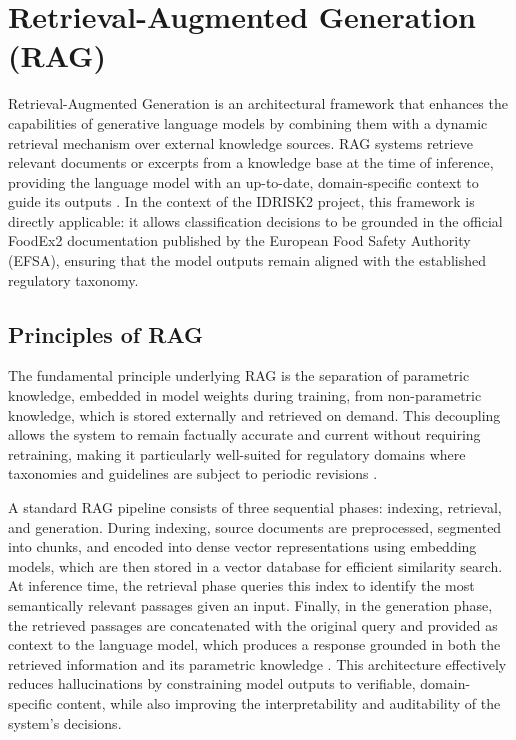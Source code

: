 \hypertarget{retrieval-augmented-generation-rag}{%
\section{Retrieval-Augmented Generation (RAG)}\label{retrieval-augmented-generation-rag}}

Retrieval-Augmented Generation is an architectural framework that enhances the capabilities of generative language models by combining them with a dynamic retrieval mechanism over external knowledge sources. RAG systems retrieve relevant documents or excerpts from a knowledge base at the time of inference, providing the language model with an up-to-date, domain-specific context to guide its outputs \parencite{patrick_lewis_10d460b7,xiaoye_qu_52f808ee}. In the context of the IDRISK2 project, this framework is directly applicable: it allows classification decisions to be grounded in the official FoodEx2 documentation published by the European Food Safety Authority (EFSA), ensuring that the model outputs remain aligned with the established regulatory taxonomy.

\hypertarget{principles-of-rag}{%
\subsection{Principles of RAG}\label{principles-of-rag}}

The fundamental principle underlying RAG is the separation of parametric knowledge, embedded in model weights during training, from non-parametric knowledge, which is stored externally and retrieved on demand. This decoupling allows the system to remain factually accurate and current without requiring retraining, making it particularly well-suited for regulatory domains where taxonomies and guidelines are subject to periodic revisions \parencite{amin_haeri_1f9fd225}.

A standard RAG pipeline consists of three sequential phases: indexing, retrieval, and generation. During indexing, source documents are preprocessed, segmented into chunks, and encoded into dense vector representations using embedding models, which are then stored in a vector database for efficient similarity search. At inference time, the retrieval phase queries this index to identify the most semantically relevant passages given an input. Finally, in the generation phase, the retrieved passages are concatenated with the original query and provided as context to the language model, which produces a response grounded in both the retrieved information and its parametric knowledge \parencite{harsh_chaudhari_a38f87a0,nirmal_kumar_roy_0d477fb0}. This architecture effectively reduces hallucinations by constraining model outputs to verifiable, domain-specific content, while also improving the interpretability and auditability of the system's decisions.

